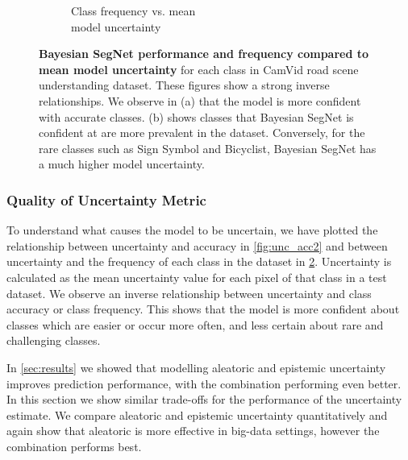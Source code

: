 \begin{figure}[t]
\begin{subfigure}[t]{0.45\linewidth}
        \centering\caption{Class frequency vs. mean\\model uncertainty}
        \label{fig:unc_freq2}
    \end{subfigure}
	\caption[Analysis of Bayesian SegNet's model uncertainty.]{\textbf{Bayesian SegNet performance and frequency compared to mean model uncertainty} for each class in CamVid road scene understanding dataset. These figures show a strong inverse relationships. We observe in (a) that the model is more confident with accurate classes. (b) shows classes that Bayesian SegNet is confident at are more prevalent in the dataset. Conversely, for the rare classes such as Sign Symbol and Bicyclist, Bayesian SegNet has a much higher model uncertainty.}
\end{figure}

\subsubsection{Quality of Uncertainty Metric}

To understand what causes the model to be uncertain, we have plotted the relationship between uncertainty and accuracy in \cref{fig:unc_acc2} and between uncertainty and the frequency of each class in the dataset in \cref{fig:unc_freq2}. Uncertainty is calculated as the mean uncertainty value for each pixel of that class in a test dataset. We observe an inverse relationship between uncertainty and class accuracy or class frequency. This shows that the model is more confident about classes which are easier or occur more often, and less certain about rare and challenging classes.

In \cref{sec:results} we showed that modelling aleatoric and epistemic uncertainty improves prediction performance, with the combination performing even better. In this section we show similar trade-offs for the performance of the uncertainty estimate. We compare aleatoric and epistemic uncertainty quantitatively and again show that aleatoric is more effective in big-data settings, however the combination performs best.


